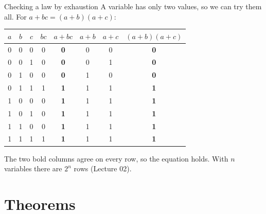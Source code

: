 \documentclass[10pt]{wosm-slides}
\begin{document}
\begin{frame}{Checking a law by exhaustion}
  A variable has only two values, so we can try them all. For
  $a + bc = (a + b)(a + c)$:

  \medskip
  \begin{center}
    \small
    \begin{tabular}{@{}ccc|cc|ccc@{}}
      $a$ & $b$ & $c$ & $bc$ & $a + bc$ & $a + b$ & $a + c$ & $(a + b)(a + c)$ \\
      \midrule
      0 & 0 & 0 & 0 & \textbf{0} & 0 & 0 & \textbf{0} \\
      0 & 0 & 1 & 0 & \textbf{0} & 0 & 1 & \textbf{0} \\
      0 & 1 & 0 & 0 & \textbf{0} & 1 & 0 & \textbf{0} \\
      0 & 1 & 1 & 1 & \textbf{1} & 1 & 1 & \textbf{1} \\
      1 & 0 & 0 & 0 & \textbf{1} & 1 & 1 & \textbf{1} \\
      1 & 0 & 1 & 0 & \textbf{1} & 1 & 1 & \textbf{1} \\
      1 & 1 & 0 & 0 & \textbf{1} & 1 & 1 & \textbf{1} \\
      1 & 1 & 1 & 1 & \textbf{1} & 1 & 1 & \textbf{1} \\
    \end{tabular}
  \end{center}

  The two bold columns agree on every row, so the equation holds.
  With $n$ variables there are $2^n$ rows (Lecture 02).
\end{frame}

\section{Theorems}
\end{document}
